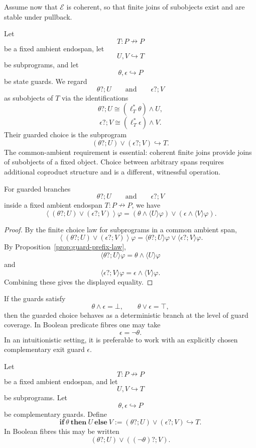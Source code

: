 Assume now that \(\mathcal E\) is coherent, so that finite joins of
subobjects exist and are stable under pullback.

Let
\[
T:P\nrightarrow P
\]
be a fixed ambient endospan, let
\[
U,V\hookrightarrow T
\]
be subprograms, and let
\[
\theta,\epsilon\hookrightarrow P
\]
be state guards. We regard
\[
\theta?;U
\qquad
\text{and}
\qquad
\epsilon?;V
\]
as subobjects of \(T\) via the identifications
\[
\theta?;U
\cong
(\ell_T^\ast\theta)\wedge U,
\]
\[
\epsilon?;V
\cong
(\ell_T^\ast\epsilon)\wedge V.
\]
Their guarded choice is the subprogram
\[
(\theta?;U)\vee(\epsilon?;V)
\hookrightarrow T.
\]
The common-ambient requirement is essential: coherent finite joins provide
joins of subobjects of a fixed object. Choice between arbitrary spans
requires additional coproduct structure and is a different, witnessful
operation.

\begin{proposition}
\label{prop:diamond-law-guarded-choice}
For guarded branches
\[
\theta?;U
\qquad
\text{and}
\qquad
\epsilon?;V
\]
inside a fixed ambient endospan \(T:P\nrightarrow P\), we have
\[
\left\langle
(\theta?;U)\vee(\epsilon?;V)
\right\rangle\varphi
=
(\theta\wedge\langle U\rangle\varphi)
\vee
(\epsilon\wedge\langle V\rangle\varphi).
\]
\end{proposition}

\begin{proof}
By the finite choice law for subprograms in a common ambient span,
\[
\left\langle
(\theta?;U)\vee(\epsilon?;V)
\right\rangle\varphi
=
\langle \theta?;U\rangle\varphi
\vee
\langle \epsilon?;V\rangle\varphi.
\]
By Proposition~\ref{prop:guard-prefix-law},
\[
\langle \theta?;U\rangle\varphi
=
\theta\wedge\langle U\rangle\varphi
\]
and
\[
\langle \epsilon?;V\rangle\varphi
=
\epsilon\wedge\langle V\rangle\varphi.
\]
Combining these gives the displayed equality.
\end{proof}

If the guards satisfy
\[
\theta\wedge\epsilon=\bot,
\qquad
\theta\vee\epsilon=\top,
\]
then the guarded choice behaves as a deterministic branch at the level of
guard coverage. In Boolean predicate fibres one may take
\[
\epsilon=\neg\theta.
\]
In an intuitionistic setting, it is preferable to work with an explicitly
chosen complementary exit guard \(\epsilon\).

\begin{definition}
\label{def:internal-conditional}
Let
\[
T:P\nrightarrow P
\]
be a fixed ambient endospan, and let
\[
U,V\hookrightarrow T
\]
be subprograms. Let
\[
\theta,\epsilon\hookrightarrow P
\]
be complementary guards. Define
\[
\mathbf{if}\ \theta\ \mathbf{then}\ U\ \mathbf{else}\ V
:=
(\theta?;U)\vee(\epsilon?;V)
\hookrightarrow T.
\]
In Boolean fibres this may be written
\[
(\theta?;U)\vee((\neg\theta)?;V).
\]
\end{definition}

